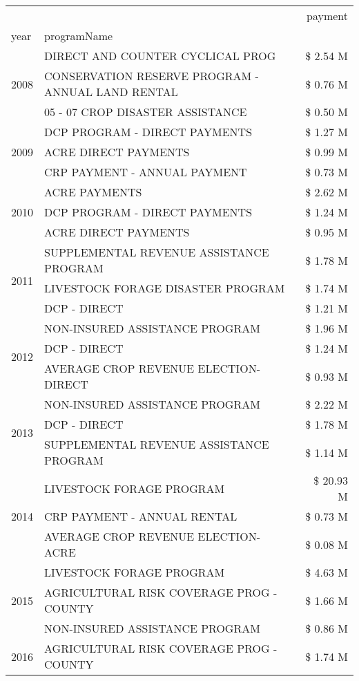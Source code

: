 \begin{tabular}{llr}
\toprule
 &  & payment \\
year & programName &  \\
\midrule
\multirow[t]{3}{*}{2008} & DIRECT AND COUNTER CYCLICAL PROG & \$ 2.54 M \\
 & CONSERVATION RESERVE PROGRAM - ANNUAL LAND RENTAL & \$ 0.76 M \\
 & 05 - 07 CROP DISASTER ASSISTANCE & \$ 0.50 M \\
\cline{1-3}
\multirow[t]{3}{*}{2009} & DCP PROGRAM - DIRECT PAYMENTS & \$ 1.27 M \\
 & ACRE DIRECT PAYMENTS & \$ 0.99 M \\
 & CRP PAYMENT - ANNUAL PAYMENT & \$ 0.73 M \\
\cline{1-3}
\multirow[t]{3}{*}{2010} & ACRE PAYMENTS & \$ 2.62 M \\
 & DCP PROGRAM - DIRECT PAYMENTS & \$ 1.24 M \\
 & ACRE DIRECT PAYMENTS & \$ 0.95 M \\
\cline{1-3}
\multirow[t]{3}{*}{2011} & SUPPLEMENTAL REVENUE ASSISTANCE PROGRAM & \$ 1.78 M \\
 & LIVESTOCK FORAGE DISASTER PROGRAM & \$ 1.74 M \\
 & DCP - DIRECT & \$ 1.21 M \\
\cline{1-3}
\multirow[t]{3}{*}{2012} & NON-INSURED ASSISTANCE PROGRAM & \$ 1.96 M \\
 & DCP - DIRECT & \$ 1.24 M \\
 & AVERAGE CROP REVENUE ELECTION-DIRECT & \$ 0.93 M \\
\cline{1-3}
\multirow[t]{3}{*}{2013} & NON-INSURED ASSISTANCE PROGRAM & \$ 2.22 M \\
 & DCP - DIRECT & \$ 1.78 M \\
 & SUPPLEMENTAL REVENUE ASSISTANCE PROGRAM & \$ 1.14 M \\
\cline{1-3}
\multirow[t]{3}{*}{2014} & LIVESTOCK FORAGE PROGRAM & \$ 20.93 M \\
 & CRP PAYMENT - ANNUAL RENTAL & \$ 0.73 M \\
 & AVERAGE CROP REVENUE ELECTION-ACRE & \$ 0.08 M \\
\cline{1-3}
\multirow[t]{3}{*}{2015} & LIVESTOCK FORAGE PROGRAM & \$ 4.63 M \\
 & AGRICULTURAL RISK COVERAGE PROG - COUNTY & \$ 1.66 M \\
 & NON-INSURED ASSISTANCE PROGRAM & \$ 0.86 M \\
\cline{1-3}
\multirow[t]{3}{*}{2016} & AGRICULTURAL RISK COVERAGE PROG - COUNTY & \$ 1.74 M \\

\end{tabular}
